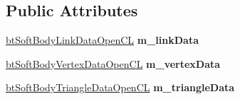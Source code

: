 \subsection*{Public Attributes}
\begin{DoxyCompactItemize}
\item 
\hypertarget{classbt_open_c_l_soft_body_solver_ab64cbdc646d5e2eeb6485df0f14300de}{\hyperlink{classbt_soft_body_link_data_open_c_l}{bt\+Soft\+Body\+Link\+Data\+Open\+C\+L} {\bfseries m\+\_\+link\+Data}}\label{classbt_open_c_l_soft_body_solver_ab64cbdc646d5e2eeb6485df0f14300de}

\item 
\hypertarget{classbt_open_c_l_soft_body_solver_aab38987d486e45f6f630100e7988aeaf}{\hyperlink{classbt_soft_body_vertex_data_open_c_l}{bt\+Soft\+Body\+Vertex\+Data\+Open\+C\+L} {\bfseries m\+\_\+vertex\+Data}}\label{classbt_open_c_l_soft_body_solver_aab38987d486e45f6f630100e7988aeaf}

\item 
\hypertarget{classbt_open_c_l_soft_body_solver_a8ed9baf61ccd15935e754e39a64d74ab}{\hyperlink{classbt_soft_body_triangle_data_open_c_l}{bt\+Soft\+Body\+Triangle\+Data\+Open\+C\+L} {\bfseries m\+\_\+triangle\+Data}}\label{classbt_open_c_l_soft_body_solver_a8ed9baf61ccd15935e754e39a64d74ab}

\end{DoxyCompactItemize}
